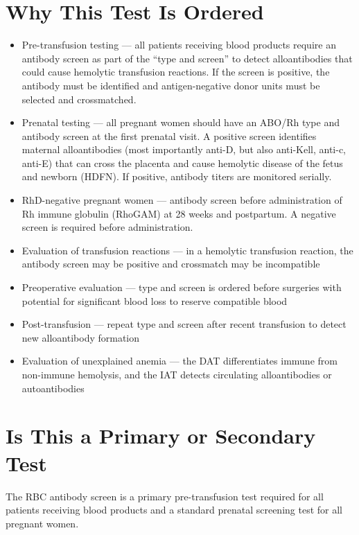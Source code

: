 \section*{Why This Test Is Ordered}
\begin{itemize}
  \item Pre-transfusion testing --- all patients receiving blood products require an antibody screen as part of the ``type and screen'' to detect alloantibodies that could cause hemolytic transfusion reactions. If the screen is positive, the antibody must be identified and antigen-negative donor units must be selected and crossmatched.
  \item Prenatal testing --- all pregnant women should have an ABO/Rh type and antibody screen at the first prenatal visit. A positive screen identifies maternal alloantibodies (most importantly anti-D, but also anti-Kell, anti-c, anti-E) that can cross the placenta and cause hemolytic disease of the fetus and newborn (HDFN). If positive, antibody titers are monitored serially.
  \item RhD-negative pregnant women --- antibody screen before administration of Rh immune globulin (RhoGAM) at 28 weeks and postpartum. A negative screen is required before administration.
  \item Evaluation of transfusion reactions --- in a hemolytic transfusion reaction, the antibody screen may be positive and crossmatch may be incompatible
  \item Preoperative evaluation --- type and screen is ordered before surgeries with potential for significant blood loss to reserve compatible blood
  \item Post-transfusion --- repeat type and screen after recent transfusion to detect new alloantibody formation
  \item Evaluation of unexplained anemia --- the DAT differentiates immune from non-immune hemolysis, and the IAT detects circulating alloantibodies or autoantibodies
\end{itemize}

\section*{Is This a Primary or Secondary Test}
The RBC antibody screen is a primary pre-transfusion test required for all patients receiving blood products and a standard prenatal screening test for all pregnant women.

